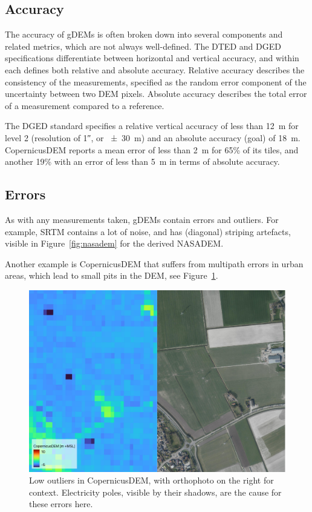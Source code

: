 \subsection{Accuracy}

The accuracy of gDEMs is often broken down into several components and related metrics, which are not always well-defined.
The DTED and DGED specifications differentiate between horizontal and vertical accuracy, and within each defines both relative and absolute accuracy.
Relative accuracy describes the consistency of the measurements, specified as the random error component of the uncertainty between two DEM pixels. %
Absolute accuracy describes the total error of a measurement compared to a reference.

%

The DGED standard specifies a relative vertical accuracy of less than \qty{12}{m} for level 2 (resolution of \ang{;;1}, or \qty{\pm30}{m}) and an absolute accuracy (goal) of \qty{18}{m}.
CopernicusDEM reports a mean error of less than \qty{2}{m} for 65\% of its tiles, and another 19\% with an error of less than \qty{5}{m} in terms of absolute accuracy.


\subsection{Errors}

As with any measurements taken, gDEMs contain errors and outliers.
For example, SRTM contains a lot of noise, and has (diagonal) striping artefacts, visible in Figure~\ref{fig:nasadem} for the derived NASADEM\@.

%

Another example is CopernicusDEM that suffers from multipath errors in urban areas, which lead to small pits in the DEM, see Figure~\ref{fig:copernicus_error}.
\begin{figure}
  \centering
  \includegraphics[width=\linewidth]{low_outliers.pdf}
  \caption{Low outliers in CopernicusDEM, with orthophoto on the right for context. Electricity poles, visible by their shadows, are the cause for these errors here.}%
  \label{fig:copernicus_error}
\end{figure}

